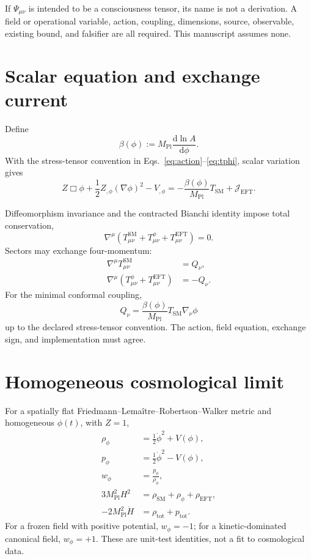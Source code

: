 \documentclass[11pt]{article}
\newcommand{\Mpl}{M_{\mathrm{Pl}}}
\newcommand{\dd}{\mathrm{d}}
\begin{document}
If $\Psi_{\mu\nu}$ is intended to be a consciousness tensor, its name is not a derivation. A field or operational variable, action, coupling, dimensions, source, observable, existing bound, and falsifier are all required. This manuscript assumes none.

\section{Scalar equation and exchange current}

Define
\begin{equation}
\beta(\phi):=\Mpl\frac{\dd\ln A}{\dd\phi}.
\end{equation}
With the stress-tensor convention in Eqs.~\eqref{eq:action}--\eqref{eq:tphi}, scalar variation gives
\begin{equation}
Z\Box\phi+\frac12Z_{,\phi}(\nabla\phi)^2-V_{,\phi}
=-\frac{\beta(\phi)}{\Mpl}T_{\mathrm{SM}}+\mathcal J_{\mathrm{EFT}}.
\label{eq:scalar-eom}
\end{equation}

Diffeomorphism invariance and the contracted Bianchi identity impose total conservation,
\begin{equation}
\nabla^\mu\left(T^{\mathrm{SM}}_{\mu\nu}+T^\phi_{\mu\nu}+T^{\mathrm{EFT}}_{\mu\nu}\right)=0.
\label{eq:total-conservation}
\end{equation}
Sectors may exchange four-momentum:
\begin{align}
\nabla^\mu T^{\mathrm{SM}}_{\mu\nu}&=Q_\nu,\\
\nabla^\mu\left(T^\phi_{\mu\nu}+T^{\mathrm{EFT}}_{\mu\nu}\right)&=-Q_\nu.
\end{align}
For the minimal conformal coupling,
\begin{equation}
Q_\nu=\frac{\beta(\phi)}{\Mpl}T_{\mathrm{SM}}\nabla_\nu\phi
\label{eq:exchange}
\end{equation}
up to the declared stress-tensor convention. The action, field equation, exchange sign, and implementation must agree.

\section{Homogeneous cosmological limit}

For a spatially flat Friedmann--Lema\^itre--Robertson--Walker metric and homogeneous $\phi(t)$, with $Z=1$,
\begin{align}
\rho_\phi&=\frac12\dot\phi^2+V(\phi),\\
p_\phi&=\frac12\dot\phi^2-V(\phi),\\
w_\phi&=\frac{p_\phi}{\rho_\phi},\\
3\Mpl^2H^2&=\rho_{\mathrm{SM}}+\rho_\phi+\rho_{\mathrm{EFT}},\\
-2\Mpl^2\dot H&=\rho_{\mathrm{tot}}+p_{\mathrm{tot}}.
\end{align}
For a frozen field with positive potential, $w_\phi=-1$; for a kinetic-dominated canonical field, $w_\phi=+1$. These are unit-test identities, not a fit to cosmological data.
\end{document}
